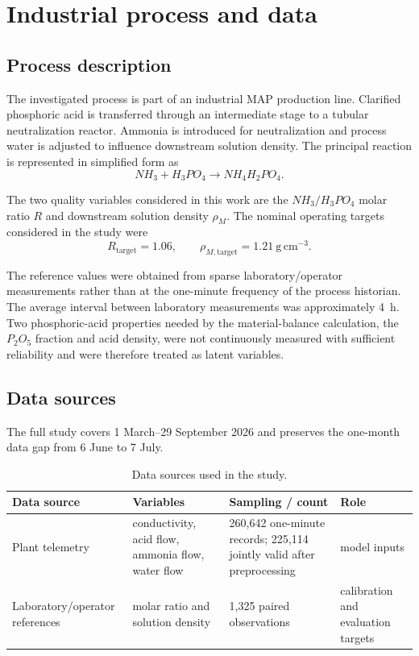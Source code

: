 \documentclass[11pt]{article}
\begin{document}
\section{Industrial process and data}

\subsection{Process description}

The investigated process is part of an industrial MAP production line. Clarified phosphoric acid is transferred through an intermediate stage to a tubular neutralization reactor. Ammonia is introduced for neutralization and process water is adjusted to influence downstream solution density. The principal reaction is represented in simplified form as
\begin{equation}
NH_3 + H_3PO_4 \rightarrow NH_4H_2PO_4.
\end{equation}

The two quality variables considered in this work are the $NH_3/H_3PO_4$ molar ratio $R$ and downstream solution density $\rho_M$. The nominal operating targets considered in the study were
\begin{equation}
R_{\mathrm{target}}=1.06,
\qquad
\rho_{M,\mathrm{target}}=1.21\ \mathrm{g\,cm^{-3}}.
\end{equation}

The reference values were obtained from sparse laboratory/operator measurements rather than at the one-minute frequency of the process historian. The average interval between laboratory measurements was approximately 4~h. Two phosphoric-acid properties needed by the material-balance calculation, the $P_2O_5$ fraction and acid density, were not continuously measured with sufficient reliability and were therefore treated as latent variables.

\subsection{Data sources}

The full study covers 1 March--29 September 2026 and preserves the one-month data gap from 6 June to 7 July.

\begin{table}[htbp]
\centering
\caption{Data sources used in the study.}
\label{tab:data}
\begin{tabular}{@{}p{3.0cm}p{4.3cm}p{4.4cm}p{2.7cm}@{}}
\toprule
Data source & Variables & Sampling / count & Role\\
\midrule
Plant telemetry & conductivity, acid flow, ammonia flow, water flow & 260,642 one-minute records; 225,114 jointly valid after preprocessing & model inputs\\
Laboratory/operator references & molar ratio and solution density & 1,325 paired observations & calibration and evaluation targets\\
\bottomrule
\end{tabular}
\end{table}
\end{document}
